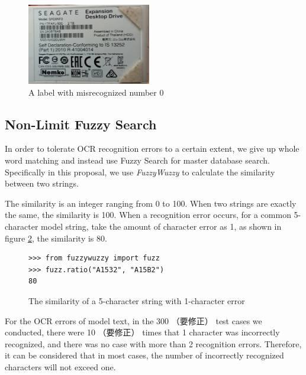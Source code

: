 \documentclass[technicalreport]{ieicej}
\begin{document}
        \begin{figure}[t] 
            \begin{center}
            \includegraphics[width=0.48\textwidth]{figure/letter-number.png}
            \end{center}
            \caption{A label with misrecognized number 0}
            \label{fig:letter-number}
        \end{figure}
    
    \subsection {Non-Limit Fuzzy Search}
        In order to tolerate OCR recognition errors to a certain extent, we give up whole word matching and instead use Fuzzy Search for master database search. Specifically in this proposal, we use {\em FuzzyWuzzy} to calculate the similarity between two strings.
        
        The similarity is an integer ranging from 0 to 100. When two strings are exactly the same, the similarity is 100. When a recognition error occurs, for a common 5-character model string, take the amount of character error as 1, as shown in figure \ref{fig:code_fuzzwuzzy}, the similarity is 80.
        
        \begin{figure}[tb]
            \begin{lstlisting}
>>> from fuzzywuzzy import fuzz
>>> fuzz.ratio("A1532", "A15B2")
80          \end{lstlisting}
            \caption{The similarity of a 5-character string with 1-character error}
            \label{fig:code_fuzzwuzzy}
        \end{figure}
        
        For the OCR errors of model text, in the 300 （要修正） test cases we conducted, there were 10 （要修正） times that 1 character was incorrectly recognized, and there was no case with more than 2 recognition errors. Therefore, it can be considered that in most cases, the number of incorrectly recognized characters will not exceed one.
        
\end{document}
